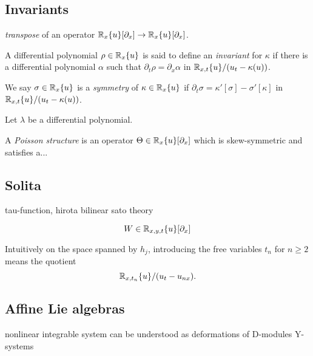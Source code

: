 \documentclass{../../../small}
\begin{document}
\subsection*{Invariants}
\begin{prb}
\emph{transpose} of an operator $\mathbb{R}_x\{u\}[\partial_x]\to\mathbb{R}_x\{u\}[\partial_x]$.
\end{prb}

\begin{prb}[Invariants]
A differential polynomial $\rho\in\mathbb{R}_x\{u\}$ is said to define an \emph{invariant} for $\kappa$ if there is a differential polynomial $\alpha$ such that $\partial_t\rho=\partial_x\alpha$ in $\mathbb{R}_{x,t}\{u\}/(u_t-\kappa(u))$.
\end{prb}

\begin{prb}[Symmetry]
We say $\sigma\in\mathbb{R}_x\{u\}$ is a \emph{symmetry} of $\kappa\in\mathbb{R}_x\{u\}$ if $\partial_t\sigma=\kappa'[\sigma]-\sigma'[\kappa]$ in $\mathbb{R}_{x,t}\{u\}/(u_t-\kappa(u))$.
\end{prb}

\begin{prb}[Lagrangian]
Let $\lambda$ be a differential polynomial.
\end{prb}


\begin{prb}
A \emph{Poisson structure} is an operator $\Theta\in\mathbb{R}_x\{u\}[\partial_x]$ which is skew-symmetric and satisfies a...
\end{prb}


\subsection*{Solita}

tau-function, hirota bilinear
sato theory

\[W\in\mathbb{R}_{x,y,t}\{u\}[\partial_x]\]

Intuitively on the space spanned by $h_j$, introducing the free variables $t_n$ for $n\ge2$ means the quotient
\[\mathbb{R}_{x,t_n}\{u\}/(u_t-u_{nx}).\]



\subsection*{Affine Lie algebras}

nonlinear integrable system can be understood as deformations of D-modules
Y-systems
\end{document}
